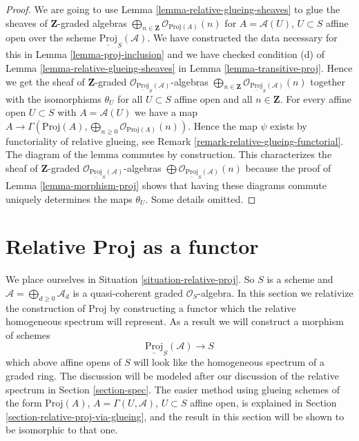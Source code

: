 \documentclass{stacks-project}
\theoremstyle{plain}
\theoremstyle{definition}
\theoremstyle{remark}
\numberwithin{equation}{subsection}
\begin{document}
\begin{proof}
We are going to use Lemma \ref{lemma-relative-glueing-sheaves}
to glue the sheaves of $\mathbf{Z}$-graded algebras
$\bigoplus_{n \in \mathbf{Z}} \mathcal{O}_{\text{Proj}(A)}(n)$
for $A = \mathcal{A}(U)$, $U \subset S$ affine open
over the scheme $\underline{\text{Proj}}_S(\mathcal{A})$.
We have constructed the data necessary for this in
Lemma \ref{lemma-proj-inclusion} and we have checked condition (d) of
Lemma \ref{lemma-relative-glueing-sheaves} in
Lemma \ref{lemma-transitive-proj}. Hence we get the
sheaf of $\mathbf{Z}$-graded
$\mathcal{O}_{\underline{\text{Proj}}_S(\mathcal{A})}$-algebras
$\bigoplus_{n \in \mathbf{Z}}
\mathcal{O}_{\underline{\text{Proj}}_S(\mathcal{A})}(n)$
together with the isomorphisms $\theta_U$ for all
$U \subset S$ affine open and all $n \in \mathbf{Z}$.
For every affine open $U \subset S$ with $A = \mathcal{A}(U)$ we have a map
$A \to \Gamma(\text{Proj}(A),
\bigoplus_{n \geq 0} \mathcal{O}_{\text{Proj}(A)}(n))$.
Hence the map $\psi$ exists by functoriality
of relative glueing, see Remark \ref{remark-relative-glueing-functorial}.
The diagram of the lemma commutes by construction.
This characterizes the sheaf of $\mathbf{Z}$-graded
$\mathcal{O}_{\underline{\text{Proj}}_S(\mathcal{A})}$-algebras
$\bigoplus \mathcal{O}_{\underline{\text{Proj}}_S(\mathcal{A})}(n)$
because the proof of Lemma \ref{lemma-morphism-proj} shows that
having these diagrams commute uniquely determines the maps $\theta_U$.
Some details omitted.
\end{proof}















\section{Relative Proj as a functor}
\label{section-relative-proj}

\noindent
We place ourselves in Situation \ref{situation-relative-proj}.
So $S$ is a scheme and $\mathcal{A} = \bigoplus_{d \geq 0} \mathcal{A}_d$
is a quasi-coherent graded $\mathcal{O}_S$-algebra.
In this section we relativize the construction of
$\text{Proj}$ by constructing a functor which the relative
homogeneous spectrum will represent.
As a result we will construct a morphism of schemes
$$
\underline{\text{Proj}}_S(\mathcal{A}) \longrightarrow S
$$
which above affine opens of $S$ will look like the homogeneous spectrum
of a graded ring. The discussion will be modeled after our
discussion of the relative spectrum in Section \ref{section-spec}.
The easier method using glueing schemes of the form
$\text{Proj}(A)$, $A = \Gamma(U, \mathcal{A})$, $U \subset S$
affine open, is explained in Section \ref{section-relative-proj-via-glueing},
and the result in this section will be shown to be isomorphic to that one.
\end{document}
